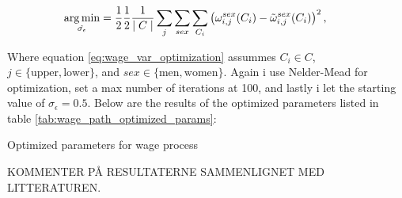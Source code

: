 \begin{equation}\label{eq:wage_var_optimization}
    \underset{\hat{\sigma_\epsilon}}{\operatorname*{arg\,min}} = \frac{1}{2}\frac{1}{2}\frac{1}{\mid C \mid } \sum_{j} \sum_{sex}\sum_{C_i} \left( \omega_{i, j}^{sex}(C_i)  - \tilde{\omega}_{i,j}^{sex}(C_i)\right)^2, \qquad 
\end{equation}

Where equation \eqref{eq:wage_var_optimization} assummes $C_i \in C$, $j \in \{\text{upper},  \text{lower} \}$, and $sex \in \{\text{men}, \text{women} \}$. Again i use Nelder-Mead for optimization, set a max number of iterations at 100, and lastly i let the starting value of $\sigma_\epsilon = 0.5$. Below are the results of the optimized parameters listed in table \ref{tab:wage_path_optimized_params}:

\begin{table}[ht]
    \centering
    
    \caption{Optimized parameters for wage process}
    \label{tab:wage_path_optimized_params}
\end{table}

KOMMENTER PÅ RESULTATERNE SAMMENLIGNET MED LITTERATUREN. 

